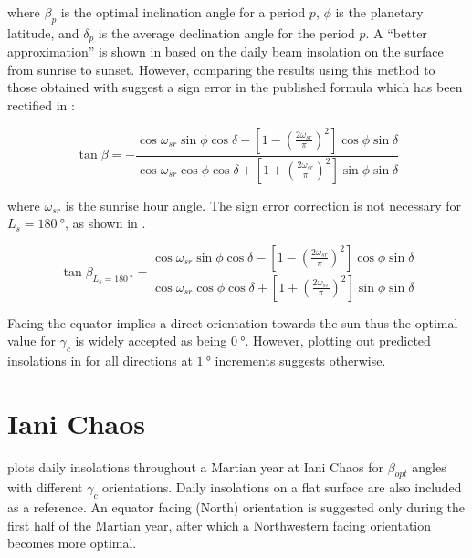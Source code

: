 where $\beta_{p}$ is the optimal inclination angle for a period $p$, $\phi$ is the planetary latitude, and $\delta_{p}$ is the average declination angle for the period $p$. A ``better approximation'' is shown in  based on the daily beam insolation on the surface from sunrise to sunset. However, comparing the results using this method to those obtained with  suggest a sign error in the published formula which has been rectified in :

\begin{equation}
  \label{eq:optimal_tanbeta_insolation}
  \tan{\beta} = -\frac{\cos{\omega_{sr}}\sin{\phi}\cos{\delta}-\left[1-\left(\frac{2\omega_{sr}}{\pi}\right)^{2}\right]\cos{\phi}\sin{\delta}}{\cos{\omega_{sr}}\cos{\phi}\cos{\delta}+\left[1+\left(\frac{2\omega_{sr}}{\pi}\right)^{2}\right]\sin{\phi}\sin{\delta}}
\end{equation}


where $\omega_{sr}$ is the sunrise hour angle. The sign error correction is not necessary for $L_{s} = \SI{180}{\degree}$, as shown in .

\begin{equation}
  \label{eq:optimal_tanbeta_insolation_Ls180}
  \tan{\beta_{L_{s} = \SI{180}{\degree}}} = \frac{\cos{\omega_{sr}}\sin{\phi}\cos{\delta}-\left[1-\left(\frac{2\omega_{sr}}{\pi}\right)^{2}\right]\cos{\phi}\sin{\delta}}{\cos{\omega_{sr}}\cos{\phi}\cos{\delta}+\left[1+\left(\frac{2\omega_{sr}}{\pi}\right)^{2}\right]\sin{\phi}\sin{\delta}}
\end{equation}

Facing the equator implies a direct orientation towards the sun thus the optimal value for $\gamma_{c}$ is widely accepted as being $\SI{0}{\degree}$. However, plotting out predicted insolations in for all directions at $\SI{1}{\degree}$ increments suggests otherwise.

\section{Iani Chaos}

 plots daily insolations throughout a Martian year at Iani Chaos for $\beta_{opt}$ angles with different $\gamma_{c}$ orientations. Daily insolations on a flat surface are also included as a reference. An equator facing (North) orientation is suggested only during the first half of the Martian year, after which a Northwestern facing orientation becomes more optimal.

